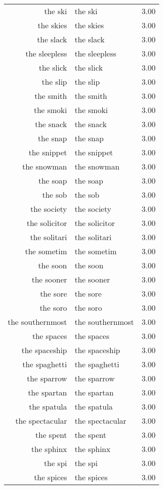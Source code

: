 \begin{table}[ht]
\begin{tabular}{rlr}
  the ski & the ski & 3.00 \\ 
  the skies & the skies & 3.00 \\ 
  the slack & the slack & 3.00 \\ 
  the sleepless & the sleepless & 3.00 \\ 
  the slick & the slick & 3.00 \\ 
  the slip & the slip & 3.00 \\ 
  the smith & the smith & 3.00 \\ 
  the smoki & the smoki & 3.00 \\ 
  the snack & the snack & 3.00 \\ 
  the snap & the snap & 3.00 \\ 
  the snippet & the snippet & 3.00 \\ 
  the snowman & the snowman & 3.00 \\ 
  the soap & the soap & 3.00 \\ 
  the sob & the sob & 3.00 \\ 
  the society & the society & 3.00 \\ 
  the solicitor & the solicitor & 3.00 \\ 
  the solitari & the solitari & 3.00 \\ 
  the sometim & the sometim & 3.00 \\ 
  the soon & the soon & 3.00 \\ 
  the sooner & the sooner & 3.00 \\ 
  the sore & the sore & 3.00 \\ 
  the soro & the soro & 3.00 \\ 
  the southernmost & the southernmost & 3.00 \\ 
  the spaces & the spaces & 3.00 \\ 
  the spaceship & the spaceship & 3.00 \\ 
  the spaghetti & the spaghetti & 3.00 \\ 
  the sparrow & the sparrow & 3.00 \\ 
  the spartan & the spartan & 3.00 \\ 
  the spatula & the spatula & 3.00 \\ 
  the spectacular & the spectacular & 3.00 \\ 
  the spent & the spent & 3.00 \\ 
  the sphinx & the sphinx & 3.00 \\ 
  the spi & the spi & 3.00 \\ 
  the spices & the spices & 3.00 \\ 

\end{tabular}
\end{table}
